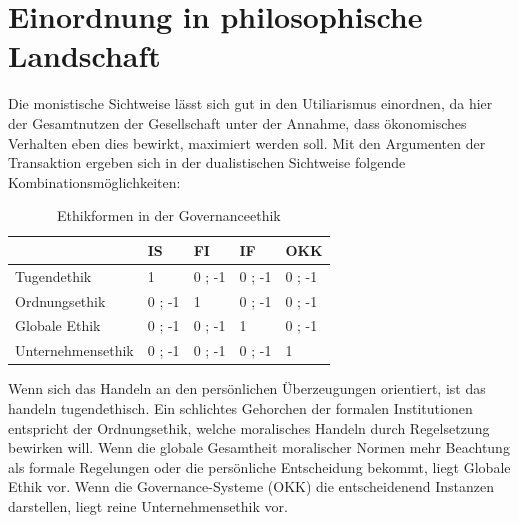 \documentclass[12pt]{article}
\begin{document}
\section{Einordnung in philosophische Landschaft}
Die monistische Sichtweise lässt sich gut in den Utiliarismus einordnen, da hier der Gesamtnutzen der Gesellschaft unter der Annahme, dass ökonomisches Verhalten eben dies bewirkt, maximiert werden soll. Mit den Argumenten der Transaktion ergeben sich in der dualistischen Sichtweise folgende Kombinationsmöglichkeiten:
\FloatBarrier
\begin{table}[ht!]
\begin{tabular}{|p{4cm}|p{2cm}|p{2cm}|p{2cm}|p{2cm}|}
\hline
 { } & IS & FI & IF & OKK\\\hline
 Tugendethik & 1 & 0 ; -1 & 0 ; -1 & 0 ; -1\\\hline
 Ordnungsethik & 0 ; -1 & 1 & 0 ; -1 & 0 ; -1\\\hline
 Globale Ethik & 0 ; -1 & 0 ; -1 & 1 & 0 ; -1\\\hline
 Unternehmensethik & 0 ; -1 & 0 ; -1 & 0 ; -1 & 1\\\hline
\end{tabular}
\caption{Ethikformen in der Governanceethik}
\end{table}
\FloatBarrier
\noindent Wenn sich das Handeln an den persönlichen Überzeugungen orientiert, ist das handeln tugendethisch. Ein schlichtes Gehorchen der formalen Institutionen entspricht der Ordnungsethik, welche moralisches Handeln durch Regelsetzung bewirken will. Wenn die globale Gesamtheit moralischer Normen mehr Beachtung als formale Regelungen oder die persönliche Entscheidung bekommt, liegt Globale Ethik vor. Wenn die Governance-Systeme (OKK) die entscheidenend Instanzen darstellen, liegt reine Unternehmensethik vor.\\[10pt]
\end{document}
